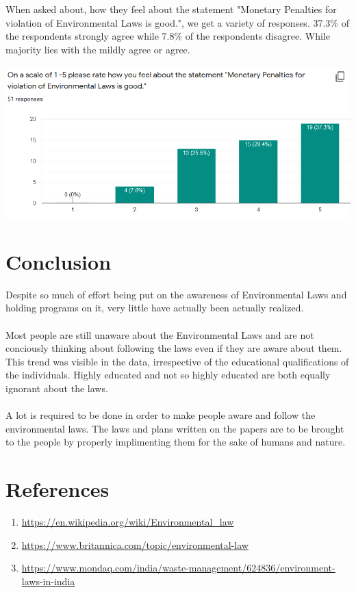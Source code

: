 \documentclass[12pt]{article}
\begin{document}
\\ \\
When asked about, how they feel about the statement "Monetary Penalties for violation of Environmental Laws is good.", we get a variety of responses. 
37.3\% of the respondents strongly agree while 7.8\% of the respondents disagree. While majority lies with the mildly agree or agree. 
\\ \\ 
\includegraphics[scale=0.7]{6}

\section{Conclusion}

Despite so much of effort being put on the awareness of Environmental Laws  
and holding programs on it, very little have actually been actually
realized.
\\ \\
\noindent
Most people are still unaware about the Environmental Laws and are not conciously thinking about following the laws even if they are aware about them. This trend was visible in the data, irrespective of the educational qualifications of the individuals. 
Highly educated and not so highly educated are both equally ignorant about the laws. 
\\ \\ 
\noindent
A lot is required to be done in order to make people aware and follow the environmental laws. The laws and plans written on the papers are to be brought to the people by properly implimenting them for the sake of humans and nature. 


\section{References}
\begin{enumerate}
    \item \url{https://en.wikipedia.org/wiki/Environmental_law}
    \item \url{https://www.britannica.com/topic/environmental-law}
    \item \url{https://www.mondaq.com/india/waste-management/624836/environment-laws-in-india}
\end{enumerate}
\end{document}
